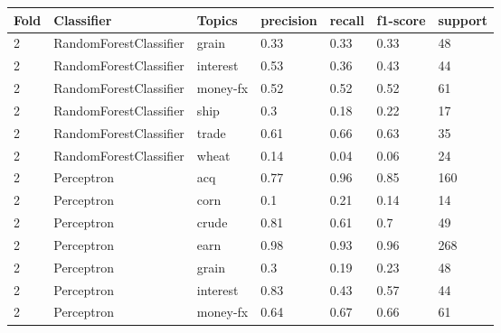 \documentclass{article}
\begin{document}
\begin{table}[h]
\begin{tabular}{lllllll}
\textbf{Fold} & \textbf{Classifier}    & \textbf{Topics} & \textbf{precision} & \textbf{recall} & \textbf{f1-score} & \textbf{support} \\ \hline
2             & RandomForestClassifier & grain           & 0.33               & 0.33            & 0.33              & 48               \\
2             & RandomForestClassifier & interest        & 0.53               & 0.36            & 0.43              & 44               \\
2             & RandomForestClassifier & money-fx        & 0.52               & 0.52            & 0.52              & 61               \\
2             & RandomForestClassifier & ship            & 0.3                & 0.18            & 0.22              & 17               \\
2             & RandomForestClassifier & trade           & 0.61               & 0.66            & 0.63              & 35               \\
2             & RandomForestClassifier & wheat           & 0.14               & 0.04            & 0.06              & 24               \\
2             & Perceptron             & acq             & 0.77               & 0.96            & 0.85              & 160              \\
2             & Perceptron             & corn            & 0.1                & 0.21            & 0.14              & 14               \\
2             & Perceptron             & crude           & 0.81               & 0.61            & 0.7               & 49               \\
2             & Perceptron             & earn            & 0.98               & 0.93            & 0.96              & 268              \\
2             & Perceptron             & grain           & 0.3                & 0.19            & 0.23              & 48               \\
2             & Perceptron             & interest        & 0.83               & 0.43            & 0.57              & 44               \\
2             & Perceptron             & money-fx        & 0.64               & 0.67            & 0.66              & 61               \\

\end{tabular}
\end{table}
\end{document}
